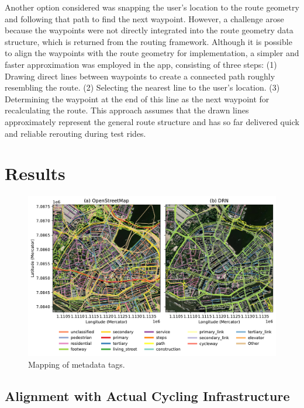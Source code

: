 Another option considered was snapping the user's location to the route geometry and following that path to find the next waypoint. However, a challenge arose because the waypoints were not directly integrated into the route geometry data structure, which is returned from the routing framework. Although it is possible to align the waypoints with the route geometry for implementation, a simpler and faster approximation was employed in the app, consisting of three steps: (1) Drawing direct lines between waypoints to create a connected path roughly resembling the route. (2) Selecting the nearest line to the user's location. (3) Determining the waypoint at the end of this line as the next waypoint for recalculating the route. This approach assumes that the drawn lines approximately represent the general route structure and has so far delivered quick and reliable rerouting during test rides.

\begin{Summary}

\end{Summary}

\section{Results}

\begin{figure}[htbp]
\centering
\includegraphics[width=\linewidth]{images/routing-drn-osm-map.pdf}
\caption{Mapping of metadata tags.}
\label{fig:}
\end{figure}

\subsection{Alignment with Actual Cycling Infrastructure}

